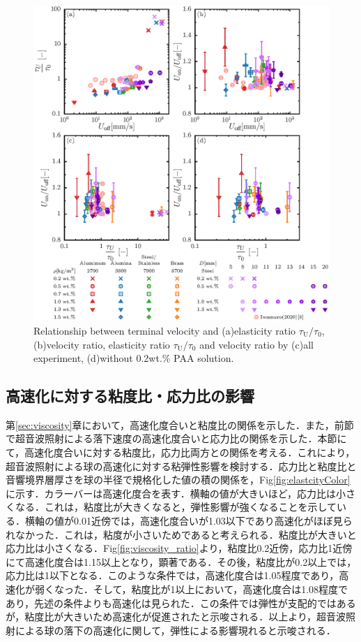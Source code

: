 \begin{figure}[H]
    \centering
    \includegraphics[width=1.0\textwidth]{5-Results/elastcity.eps}
    \caption{Relationship between terminal velocity and (a)elasticity ratio $\tau_\text{U}/\tau_\text{0}$, (b)velocity ratio, elasticity ratio $\tau_\text{U}/\tau_\text{0}$ and velocity ratio by (c)all experiment, (d)without 0.2wt.\% PAA solution.}
    \label{fig:elastcity}
\end{figure}

\subsection{高速化に対する粘度比・応力比の影響}
第\ref{sec:viscosity}章において，高速化度合いと粘度比の関係を示した．また，前節で超音波照射による落下速度の高速化度合いと応力比の関係を示した．本節にて，高速化度合いに対する粘度比，応力比両方との関係を考える．これにより，超音波照射による球の高速化に対する粘弾性影響を検討する．応力比と粘度比と音響境界層厚さを球の半径で規格化した値の積の関係を，Fig\ref{fig:elastcityColor}に示す．カラーバーは高速化度合を表す．横軸の値が大きいほど，応力比は小さくなる．これは，粘度比が大きくなると，弾性影響が強くなることを示している．横軸の値が0.01近傍では，高速化度合いが1.03以下であり高速化がほぼ見られなかった．これは，粘度が小さいためであると考えられる．粘度比が大きいと応力比は小さくなる．Fig\ref{fig:viscosity_ratio}より，粘度比0.2近傍，応力比1近傍にて高速化度合は1.15以上となり，顕著である．その後，粘度比が0.2以上では，応力比は1以下となる．このような条件では，高速化度合は1.05程度であり，高速化が弱くなった．そして，粘度比が1以上において，高速化度合は1.08程度であり，先述の条件よりも高速化は見られた．この条件では弾性が支配的ではあるが，粘度比が大きいため高速化が促進されたと示唆される．以上より，超音波照射による球の落下の高速化に関して，弾性による影響現れると示唆される．

